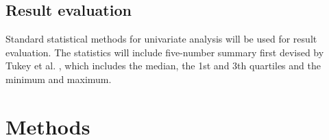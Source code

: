 

\subsection{Result evaluation} \label{subsec:validation} %


Standard statistical methods for univariate analysis will be used for result evaluation. The statistics will include five-number summary first devised by Tukey et al. \cite{tukeyExploratoryDataAnalysis1977a}, which includes the median, the 1st and 3th quartiles and the minimum and maximum.







\section{Methods} \label{sec:casestudy}


